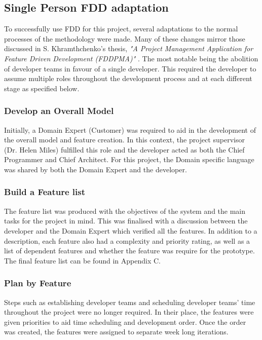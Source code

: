 \subsection{Single Person FDD adaptation}
To successfully use FDD for this project, several adaptations to the normal processes of the methodology were made. Many of these changes mirror those discussed in S. Khramthchenko's thesis, \textit{"A Project Management Application for Feature Driven Development (FDDPMA)"} \cite{single_person_fdd}. The most notable being the abolition of developer teams in favour of a single developer. This required the developer to assume multiple roles throughout the development process and at each different stage as specified below.

\subsubsection{Develop an Overall Model}
Initially, a Domain Expert (Customer) was required to aid in the development of the overall model and feature creation. In this context, the project supervisor (Dr. Helen Miles) fulfilled this role and the developer acted as both the Chief Programmer and Chief Architect. For this project, the Domain specific language was shared by both the Domain Expert and the developer.

\subsubsection{Build a Feature list}
The feature list was produced with the objectives of the system and  the main tasks for the project in mind. This was finalised with a discussion between the developer and the Domain Expert which verified all the features. In addition to a description, each feature also had a complexity and priority rating, as well as a list of dependent features and whether the feature was require for the prototype. The final feature list can be found in Appendix C.

\subsubsection{Plan by Feature}
Steps such as establishing developer teams and scheduling developer teams' time throughout the project were no longer required. In their place, the features were given priorities to aid time scheduling and development order. Once the order was created, the features were assigned to separate week long iterations.

